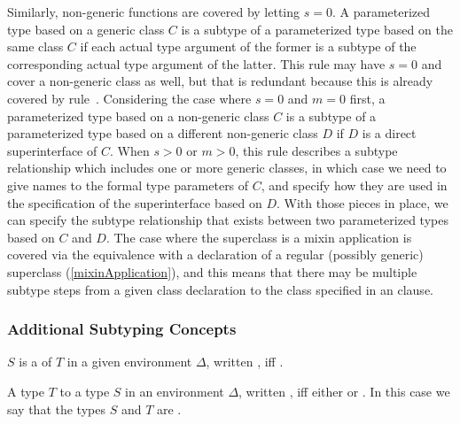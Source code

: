 \documentclass[makeidx]{article}
\begin{document}
{{\begin{itemize}
    Similarly, non-generic functions are covered by letting $s = 0$.
    A parameterized type based on a generic class $C$ is a subtype of
    a parameterized type based on the same class $C$ if
    each actual type argument of the former is a subtype of
    the corresponding actual type argument of the latter.
    This rule may have $s = 0$ and cover a non-generic class as well,
    but that is redundant because this is already covered by
    rule~\SrnReflexivity.
    Considering the case where $s = 0$ and $m = 0$ first,
    a parameterized type based on a non-generic class $C$ is a subtype of
    a parameterized type based on a different non-generic class $D$ if
    $D$ is a direct superinterface of $C$.
    When $s > 0$ or $m > 0$, this rule describes a subtype relationship
    which includes one or more generic classes,
    in which case we need to give names to the formal type parameters of $C$,
    and specify how they are used in the specification of the superinterface
    based on $D$.
    With those pieces in place, we can specify the subtype relationship
    that exists between two parameterized types based on $C$ and $D$.
    The case where the superclass is a mixin application is covered via
    the equivalence with a declaration of
    a regular (possibly generic) superclass
    (\ref{mixinApplication}),
    and this means that there may be multiple subtype steps from
    a given class declaration to the class specified in an \EXTENDS{} clause.
  \end{itemize}%
}


\subsubsection{Additional Subtyping Concepts}

\LMHash{}%
$S$ is a  of $T$ in a given environment $\Delta$,
written ,
if{}f .

\LMHash{}%
A type $T$
to a type $S$ in an environment $\Delta$,
written ,
if{}f either  or .
In this case we say that the types $S$ and $T$ are
.

}
\end{document}

